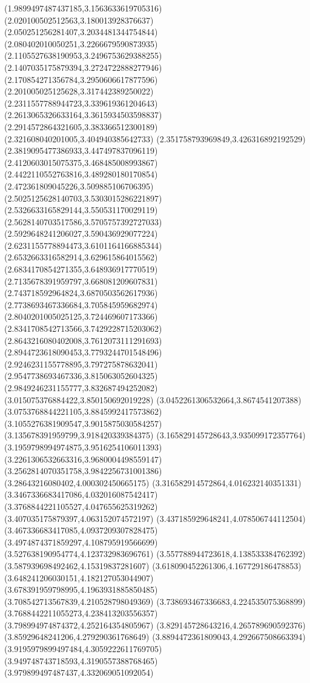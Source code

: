 {(1.9899497487437185,3.1563633619705316)
(2.020100502512563,3.180013928376637)
(2.050251256281407,3.2034481344754844)
(2.080402010050251,3.2266679590873935)
(2.1105527638190953,3.2496753629388255)
(2.1407035175879394,3.2724722888277946)
(2.170854271356784,3.2950606617877596)
(2.201005025125628,3.317442389250022)
(2.2311557788944723,3.339619361204643)
(2.2613065326633164,3.3615934503598837)
(2.2914572864321605,3.383366512300189)
(2.321608040201005,3.404940385642733)
(2.351758793969849,3.426316892192529)
(2.3819095477386933,3.447497837096119)
(2.4120603015075375,3.468485008993867)
(2.4422110552763816,3.489280180170854)
(2.472361809045226,3.509885106706395)
(2.5025125628140703,3.5303015286221897)
(2.5326633165829144,3.550531170029119)
(2.5628140703517586,3.5705757392727033)
(2.5929648241206027,3.590436929077224)
(2.6231155778894473,3.6101164166885344)
(2.6532663316582914,3.629615864015562)
(2.6834170854271355,3.648936917770519)
(2.7135678391959797,3.668081209607831)
(2.743718592964824,3.6870503562617936)
(2.7738693467336684,3.705845959682974)
(2.8040201005025125,3.724469607173366)
(2.8341708542713566,3.7429228715203062)
(2.8643216080402008,3.7612073111291693)
(2.8944723618090453,3.7793244701548496)
(2.9246231155778895,3.797275878632041)
(2.9547738693467336,3.815063052604325)
(2.9849246231155777,3.832687494252082)
(3.015075376884422,3.850150692019228)
(3.0452261306532664,3.8674541207388)
(3.0753768844221105,3.8845992417573862)
(3.1055276381909547,3.9015875030584257)
(3.135678391959799,3.918420339384375)
(3.165829145728643,3.935099172357764)
(3.1959798994974875,3.9516254106011393)
(3.2261306532663316,3.9680004498559147)
(3.2562814070351758,3.9842256731001386)
(3.28643216080402,4.000302450665175)
(3.316582914572864,4.016232140351331)
(3.3467336683417086,4.032016087542417)
(3.3768844221105527,4.047655625319262)
(3.407035175879397,4.063152074572197)
(3.437185929648241,4.078506744112504)
(3.467336683417085,4.0937209307828475)
(3.4974874371859297,4.108795919566699)
(3.527638190954774,4.123732983696761)
(3.557788944723618,4.138533384762392)
(3.587939698492462,4.15319837281607)
(3.618090452261306,4.167729186478853)
(3.648241206030151,4.182127053044907)
(3.678391959798995,4.1963931885850485)
(3.708542713567839,4.210528798049369)
(3.738693467336683,4.224535075368899)
(3.7688442211055273,4.238413203556357)
(3.798994974874372,4.252164354805967)
(3.829145728643216,4.265789690592376)
(3.85929648241206,4.279290361768649)
(3.8894472361809043,4.292667508663394)
(3.9195979899497484,4.3059222611769705)
(3.949748743718593,4.3190557388768465)
(3.979899497487437,4.332069051092054)
}
